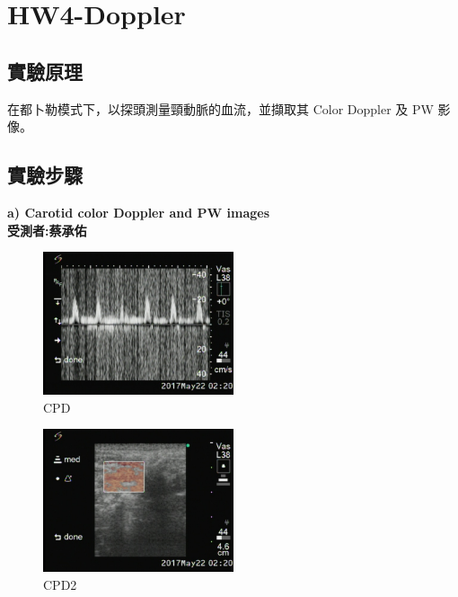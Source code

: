 \documentclass[12pts,a4paper]{article}
\begin{document}
\pagebreak
\section{HW4-Doppler}
\subsection{實驗原理}
在都卜勒模式下，以探頭測量頸動脈的血流，並擷取其 Color Doppler 及 PW 影像。
\subsection{實驗步驟}
\textbf{a) Carotid color Doppler and PW images} \\
\textbf{受測者:蔡承佑} \\
\begin{figure}[h]
    \centering
    \includegraphics[width=0.5\textwidth]{img_hw4/CPD.jpg}
    \caption{CPD}
    \label{fig:mesh1}
\end{figure}
\begin{figure}[h]
    \centering
    \includegraphics[width=0.5\textwidth]{img_hw4/CPD-2.jpg}
    \caption{CPD2}
    \label{fig:mesh1}
\end{figure}
\end{document}
